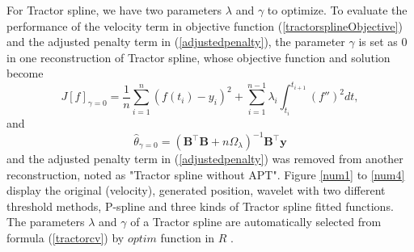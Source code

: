 For Tractor spline, we have two parameters $\lambda$ and $\gamma$ to optimize. To evaluate the performance of the velocity term in objective function (\ref{tractorsplineObjective}) and the adjusted penalty term in (\ref{adjustedpenalty}), the parameter $\gamma$ is set as 0 in one reconstruction of Tractor spline, whose objective function and solution become
\begin{equation}\label{ofgamma0}
J[f]_{\gamma=0}= \frac{1}{n} \sum_{i=1}^{n} (f(t_i)-y_i)^2 +\sum_{i=1}^{n-1} \lambda_i\int_{t_i}^{t_{i+1}} (f'')^2 dt,
\end{equation}
and
\begin{equation}\label{thetahat0}
\hat{\theta}_{\gamma=0}=(\mathbf{B}^\top\mathbf{B}+n\Omega_{\lambda})^{-1}\mathbf{B}^\top\mathbf{y}
\end{equation}
and the adjusted penalty term in (\ref{adjustedpenalty}) was removed from another reconstruction, noted as "Tractor spline without APT". Figure \ref{num1} to \ref{num4} display the original (velocity), generated position, wavelet with two different threshold methods, P-spline and three kinds of Tractor spline fitted functions. The parameters $\lambda$ and $\gamma$ of a Tractor spline are automatically selected from formula (\ref{tractorcv}) by $\textit{optim}$ function in $R$ \cite{nelder1965simplex}.



